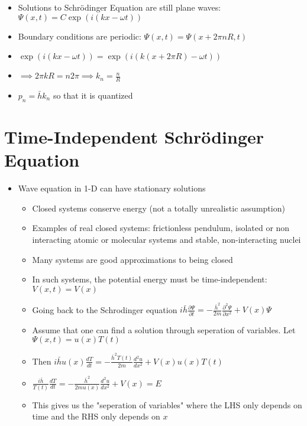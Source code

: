 \documentclass[12pt]{article}
\begin{document}
\begin{itemize}
\begin{itemize}
        \item Solutions to Schr\"{o}dinger Equation are still plane waves: $\varPsi(x,t) = C \exp(i(kx - \omega t))$
        \item Boundary conditions are periodic: $\varPsi(x,t) = \varPsi(x + 2 \pi nR, t)$
        \item $\exp (i(kx - \omega t)) = \exp (i(k(x + 2\pi R) - \omega t))$
        \item $\implies 2 \pi kR = n 2 \pi \implies k_n = \frac{n}{R}$
        \item $p_n = \bar{h} k_n$ so that it is quantized
    \end{itemize}
\end{itemize}

\section{Time-Independent Schr\"{o}dinger Equation} \begin{itemize}
    \item Wave equation in 1-D can have stationary solutions \begin{itemize}
        \item Closed systems conserve energy (not a totally unrealistic assumption)
        \item Examples of real closed systems: frictionless pendulum, isolated or non interacting atomic or molecular systems and stable, non-interacting nuclei
        \item Many systems are good approximations to being closed
        \item In such systems, the potential energy must be time-independent: $V(x, t) = V(x)$
        \item Going back to the Schrodinger equation $i \bar{h} \frac{\partial \varPsi}{\partial t} = - \frac{\bar{h}^2}{2m} \frac{\partial^2 \varPsi}{\partial x^2} + V(x) \varPsi$
        \item Assume that one can find a solution through seperation of variables. Let  $\varPsi (x,t) = u(x) T(t)$
        \item Then $i \bar{h} u(x) \frac{dT}{dt} = - \frac{\bar{h}^2 T(t)}{2m} \frac{d^2 u}{dx^2} + V(x)u(x)T(t)$
        \item $\frac{i \bar{h}}{T(t)} \frac{dT}{dt} = - \frac{\bar{h}^2}{2mu(x)} \frac{d^2 u}{dx^2} + V(x) = E$
        \item This gives us the "seperation of variables" where the LHS only depends on time and the RHS only depends on $x$

\end{itemize}
\end{itemize}
\end{document}
